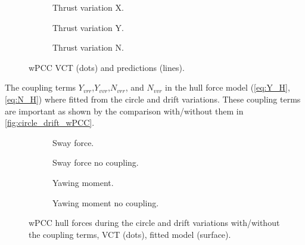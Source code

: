 \begin{figure}[h]
     \vfill
     \begin{subfigure}[b]{0.32\textwidth}
         \centering
         
        \caption{Thrust variation X.}
        \label{fig:Thrust variation_X_wPCC}
     \end{subfigure}
     \hfill
     \begin{subfigure}[b]{0.32\textwidth}
         \centering
         
        \caption{Thrust variation Y.}
        \label{fig:Thrust variation_Y_wPCC}
     \end{subfigure}
     \hfill
     \begin{subfigure}[b]{0.32\textwidth}
         \centering
         
        \caption{Thrust variation N.}
        \label{fig:Thrust variation_N_wPCC}
     \end{subfigure}
     
    \caption{wPCC VCT (dots) and predictions (lines).}
    \label{fig:VCT_wPCC}
\end{figure}
The coupling terms $Y_{vrr}$,$Y_{vvr}$,$N_{vrr}$, and $N_{vvr}$ in the hull force model (\autoref{eq:Y_H}, \autoref{eq:N_H}) where fitted from the circle and drift variations. These coupling terms are important as shown by the comparison with/without them in \autoref{fig:circle_drift_wPCC}.
\begin{figure}[h]
     \centering
     \begin{subfigure}[b]{0.49\textwidth}
         \centering
         
        \caption{Sway force.}
        \label{fig:circle_drift_Y_H_wPCC}
     \end{subfigure}
     \hfill
     \begin{subfigure}[b]{0.49\textwidth}
         \centering
         
        \caption{Sway force no coupling.}
        \label{fig:circle_drift_Y_H_no_coupling_wPCC}
     \end{subfigure}

     \vfill
     \begin{subfigure}[b]{0.49\textwidth}
         \centering
         
        \caption{Yawing moment.}
        \label{fig:circle_drift_N_H_wPCC}
     \end{subfigure}
     \hfill
     \begin{subfigure}[b]{0.49\textwidth}
         \centering
         
        \caption{Yawing moment no coupling.}
        \label{fig:circle_drift_N_H_no_coupling_wPCC}
     \end{subfigure}
     
    \caption{wPCC hull forces during the circle and drift variations with/without the coupling terms, VCT (dots), fitted model (surface).}
    \label{fig:circle_drift_wPCC}
\end{figure}

